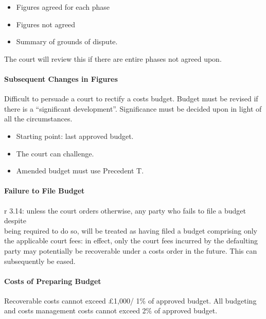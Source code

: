 \documentclass[
]{article}
\providecommand{\tightlist}{%
  \setlength{\itemsep}{0pt}\setlength{\parskip}{0pt}}
\begin{document}
\begin{itemize}
\tightlist
\item
  Figures agreed for each phase
\item
  Figures not agreed
\item
  Summary of grounds of dispute.
\end{itemize}

The court will review this if there are entire phases not agreed upon.

\hypertarget{subsequent-changes-in-figures}{%
\paragraph{Subsequent Changes in
Figures}\label{subsequent-changes-in-figures}}

Difficult to persuade a court to rectify a costs budget. Budget must be
revised if there is a ``significant development''. Significance must be
decided upon in light of all the circumstances.

\begin{itemize}
\tightlist
\item
  Starting point: last approved budget.
\item
  The court can challenge.
\item
  Amended budget must use Precedent T.
\end{itemize}

\hypertarget{failure-to-file-budget}{%
\paragraph{Failure to File Budget}\label{failure-to-file-budget}}

r 3.14: unless the court orders otherwise, any party who fails to file a
budget despite\\
being required to do so, will be treated as having filed a budget
comprising only the applicable court fees: in effect, only the court
fees incurred by the defaulting party may potentially be recoverable
under a costs order in the future. This can subsequently be eased.

\hypertarget{costs-of-preparing-budget}{%
\paragraph{Costs of Preparing Budget}\label{costs-of-preparing-budget}}

Recoverable costs cannot exceed £1,000/ 1\% of approved budget. All
budgeting and costs management costs cannot exceed 2\% of approved
budget.
\end{document}
